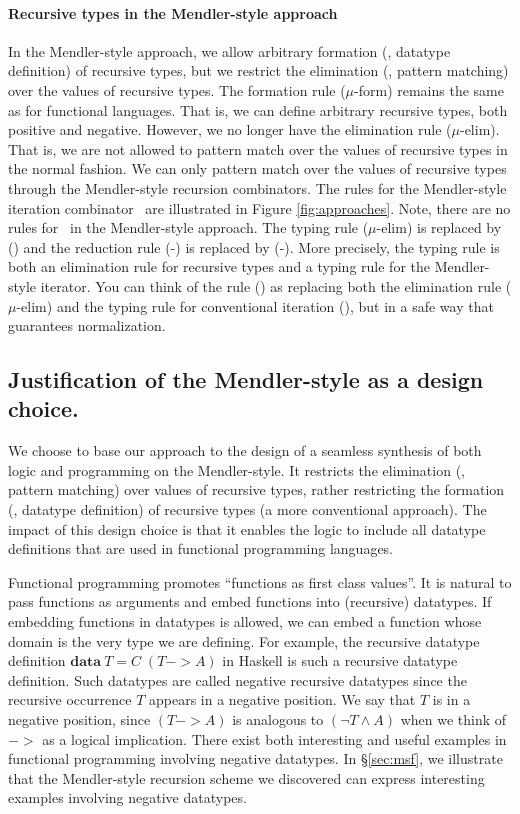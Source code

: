 \paragraph{Recursive types in the Mendler-style approach}
In the Mendler-style approach, we allow arbitrary formation
(\ie, datatype definition) of recursive types, but we restrict
the elimination (\ie, pattern matching) over the values of recursive types. 
The formation rule {\small($\mu$-form)} remains the same as
for functional languages. That is, we can define arbitrary recursive types,
both positive and negative. However, we no longer have the elimination
rule {\small($\mu$-elim)}. That is, we are not allowed to pattern match over
the values of recursive types in the normal fashion. We can only pattern match
over the values of recursive types through the Mendler-style recursion
combinators. The rules for the Mendler-style iteration combinator \MIt\
are illustrated in Figure \ref{fig:approaches}.
Note, there are no rules for \unIn\ in the Mendler-style approach.
The typing rule {\small($\mu$-elim)} is replaced by {\small(\MIt)} and
the reduction rule {\small(\unIn-\In)} is replaced by {\small(\MIt-\In)}.
More precisely, the typing rule {\small \MIt} is both an elimination rule
for recursive types and a typing rule for the Mendler-style iterator.
You can think of the rule {\small(\MIt)} as replacing both the elimination rule
{\small($\mu$-elim)} and the typing rule for conventional iteration
{\small(\It)}, but in a safe way that guarantees normalization.

\subsection{Justification of the Mendler-style as a design choice.}
\label{sec:intro:concepts:mendler}
We choose to base our approach to the design of a seamless synthesis of both
logic and programming on the Mendler-style. It restricts the elimination (\ie,
pattern matching) over values of recursive types, rather restricting the
formation (\ie, datatype definition) of recursive types (a more conventional
approach). The impact of this design choice is that it enables the logic to
include all datatype definitions that are used in functional programming
languages.

Functional programming promotes ``functions as first class values''.
It is natural to pass functions as arguments and embed functions into
(recursive) datatypes. If embedding functions in datatypes is allowed,
we can embed a function whose domain is the very type we are defining.
For example, the recursive datatype definition
$\mathbf{data}~T = C\;(T -> \textit{A})$ in Haskell is such a recursive
datatype definition. Such datatypes are called negative recursive datatypes
since the recursive occurrence $T$ appears in a negative position.
We say that $T$ is in a negative position, since $(T -> A)$ is analogous to
$(\neg T \land A)$ when we think of $->$ as a logical implication. There exist
both interesting and useful examples in functional programming involving
negative datatypes. In \S\ref{sec:msf}, we illustrate that
the Mendler-style recursion scheme we discovered can express
interesting examples involving negative datatypes.

